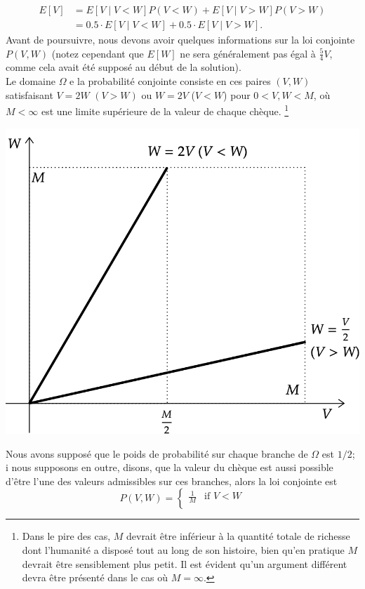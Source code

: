 \begin{Exemple}
\begin{equation*}
\begin{aligned}
E[V]&=E[V\mid V<W]P(V<W) + E[V\mid V>W]P(V>W) \\ &=0.5\cdot E[V\mid V<W]+ 0.5\cdot E[V\mid V>W].
\end{aligned}
\end{equation*}
Avant de poursuivre, nous devons avoir quelques informations sur la loi conjointe $P(V,W)$ (notez cependant que $E[W]$ ne sera g\'en\'eralement pas \'egal \`a $\frac{5}{4}V$, comme cela avait \'et\'e suppos\'e au d\'ebut de
la solution). \\
Le domaine $\Omega$ e la probabilit\'e conjointe consiste en ces paires $(V, W)$ satisfaisant $V=2W$ $(V>W)$ ou $W=2V$ ($V<W$) pour $0<V,W<M$, où $M<\infty$ est une limite sup\'erieure de la valeur de chaque ch\`eque. \footnote{Dans le pire des cas, $M$ devrait être inf\'erieur \`a la quantit\'e totale de richesse dont l'humanit\'e a dispos\'e tout au long de son histoire, bien qu'en pratique $M$ devrait être sensiblement plus petit. Il est \'evident qu'un argument diff\'erent devra être pr\'esent\'e dans le cas où $M=\infty$.}
\begin{center}
\includegraphics[width=0.9\linewidth]{Images/envelope.png}
\end{center}
\noindent Nous avons suppos\'e que le poids de probabilit\'e sur chaque branche de $\Omega$ est $1/2$; i nous supposons en outre, disons, que la valeur du ch\`eque est aussi possible d'être l'une des valeurs admissibles sur ces branches, alors la loi conjointe est
$$P(V,W)=\begin{cases}
\frac{1}{M} & \text{if $V<W$} \\

\end{cases}$$
\end{Exemple}
